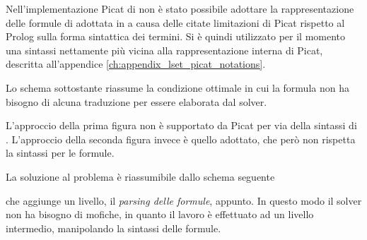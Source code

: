 \documentclass[12pt,a4paper,openright]{book} %
\begin{document}
Nell'implementazione Picat di \lset{} non è stato possibile adottare
la rappresentazione delle formule di \lset{} adottata in \setlog{} a
causa delle citate limitazioni di Picat rispetto al Prolog sulla forma
sintattica dei termini. Si è quindi utilizzato per il momento una
sintassi nettamente più vicina alla rappresentazione interna di Picat,
descritta all'appendice \ref{ch:appendix_lset_picat_notations}.

Lo schema sottostante riassume la condizione ottimale in cui la
formula non ha bisogno di alcuna traduzione per essere elaborata dal
solver.

\begin{figure}[H]
	\centering
	\begin{minipage}[b]{0.4\textwidth}
		\centering
		\label{fig:formula_lset_solver}
	\end{minipage}%
	\begin{minipage}[b]{0.4\textwidth}
		\centering
	\end{minipage}
\end{figure}
L'approccio della prima figura non è supportato da Picat per via della
sintassi di \lset{}. L'approccio della seconda figura invece è quello
adottato, che però non rispetta la sintassi \lset{} per le formule.

La soluzione al problema è riassumibile dallo schema seguente
\begin{figure}[H]
\centering
{}
\end{figure}
che aggiunge un livello, il \emph{parsing delle formule}, appunto. In
questo modo il solver non ha bisogno di mofiche, in quanto il lavoro è
effettuato ad un livello intermedio, manipolando la sintassi delle
formule.
\end{document}

